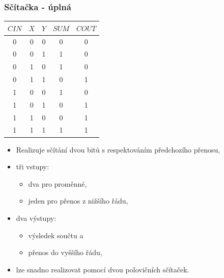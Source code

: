 	\begin{frame}
    \frametitle{Sčítačka - úplná}
		
		\begin{minipage}[t][\textheight][t]{0.5\textwidth}
		\vspace{10mm}
		\begin{center}
			\begin{tabular}{ c c c | c c }
				$CIN$ & $X$ & $Y$ & $SUM$ & $COUT$\\
				\hline
				0 & 0 & 0 & 0 & 0 \\
				0 & 0 & 1 & 1 & 0 \\
				0 & 1 & 0 & 1 & 0 \\
				0 & 1 & 1 & 0 & 1 \\
				1 & 0 & 0 & 1 & 0 \\
				1 & 0 & 1 & 0 & 1 \\
				1 & 1 & 0 & 0 & 1 \\
				1 & 1 & 1 & 1 & 1 \\
			\end{tabular}
		\end{center}

		\end{minipage}
		\begin{minipage}[t][\textheight][t]{0.45\textwidth}

			\begin{itemize}
				\item Realizuje sčítání dvou bitů s respektováním předchozího přenosu,
				\item tři vstupy:
				
				\begin{itemize}
					\item dva pro proměnné,
					\item jeden pro přenos z nižšího řádu,
				\end{itemize}
				
				\item dva výstupy:
				
				\begin{itemize}
					\item výsledek součtu a
					\item přenos do vyššího řádu,
				\end{itemize}
				
				\item lze snadno realizovat pomocí dvou polovičních sčítaček.
			\end{itemize}

		\end{minipage}
		
	\end{frame}
	
